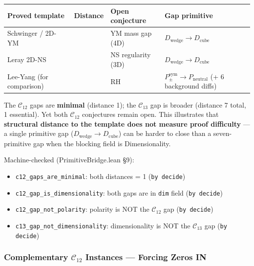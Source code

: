 \documentclass[12pt,a4paper]{article}
\newcommand{\pilcrow}{\S}
\begin{document}
\begin{table}[htbp]
\centering
\small
{}
\begin{tabularx}{\textwidth}{>{\centering\arraybackslash}X >{\centering\arraybackslash}X >{\centering\arraybackslash}X >{\centering\arraybackslash}X}
\toprule
\rowcolor{gray!25}\textbf{Proved template} & \textbf{Distance} & \textbf{Open conjecture} & \textbf{Gap primitive} \\
\midrule
\rowcolors{1}{white}{gray!10}
Schwinger / 2D-YM & 1 & YM mass gap (4D) & $D_\text{wedge} \to D_\text{cube}$ \\
Leray 2D-NS & 1 & NS regularity (3D) & $D_\text{wedge} \to D_\text{cube}$ \\
Lee-Yang (for comparison) & 7 & RH & $P_{\pm}^{\text{sym}} \to P_\text{neutral}$ (+ 6 background diffs) \\
\bottomrule
\end{tabularx}
\end{table}

The $\mathcal{C}_{12}$ gaps are \textbf{minimal} (distance 1); the $\mathcal{C}_{13}$ gap is broader (distance 7 total, 1 essential). Yet both $\mathcal{C}_{12}$ conjectures remain open. This illustrates that \textbf{structural distance to the template does not measure proof difficulty} --- a single primitive gap ($D_\text{wedge} \to D_\text{cube}$) can be harder to close than a seven-primitive gap when the blocking field is Dimensionality.

Machine-checked (PrimitiveBridge.lean \pilcrow{}9):

\begin{itemize}
    \item \texttt{c12\_gaps\_are\_minimal}: both distances = 1 (\texttt{by decide})
    \item \texttt{c12\_gap\_is\_dimensionality}: both gaps are in \texttt{dim} field (\texttt{by decide})
    \item \texttt{c12\_gap\_not\_polarity}: polarity is NOT the $\mathcal{C}_{12}$ gap (\texttt{by decide})
    \item \texttt{c13\_gap\_not\_dimensionality}: dimensionality is NOT the $\mathcal{C}_{13}$ gap (\texttt{by decide})
\end{itemize}

\subsubsection{Complementary $\mathcal{C}_{12}$ Instances --- Forcing Zeros IN}
\end{document}

